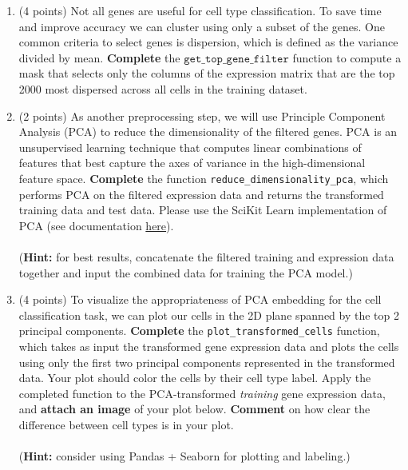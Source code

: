 \begin{enumerate}
\item (4 points) Not all genes are useful for cell type classification. To save time and improve accuracy we can cluster using only a subset of the genes. One common criteria to select genes is dispersion, which is defined as the variance divided by mean. \textbf{Complete} the $\texttt{get\_top\_gene\_filter}$ function to compute a mask that selects only the columns of the expression matrix that are the top 2000 most dispersed across all cells in the training dataset.

\item (2 points) 
As another preprocessing step, we will use Principle Component Analysis (PCA) to reduce the dimensionality of the filtered genes. PCA is an unsupervised learning technique that computes linear combinations of features that best capture the axes of variance in the high-dimensional feature space. \textbf{Complete} the function \texttt{reduce\_dimensionality\_pca}, which performs PCA on the filtered expression data and returns the transformed training data and test data. Please use the SciKit Learn implementation of PCA (see documentation \href{https://scikit-learn.org/stable/modules/generated/sklearn.decomposition.PCA.html}{here}).
\\\\
(\textbf{Hint:} for best results, concatenate the filtered training and expression data together and input the combined data for training the PCA model.)

\item (4 points) 
To visualize the appropriateness of PCA embedding for the cell classification task, we can plot our cells in the 2D plane spanned by the top 2 principal components. \textbf{Complete} the \texttt{plot\_transformed\_cells} function, which takes as input the transformed gene expression data and plots the cells using only the first two principal components represented in the transformed data. Your plot should color the cells by their cell type label. Apply the completed function to the PCA-transformed \textit{training} gene expression data, and \textbf{attach an image} of your plot below. \textbf{Comment} on how clear the difference between cell types is in your plot.
\\\\
(\textbf{Hint:} consider using Pandas + Seaborn for plotting and labeling.)

\begin{solution}


\end{solution}
\end{enumerate}
